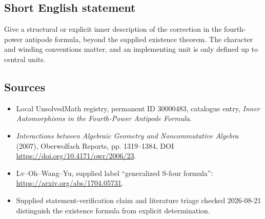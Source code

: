 \documentclass[11pt]{article}
\begin{document}
\subsection{Short English statement}
Give a structural or explicit inner description of the correction in the fourth-power antipode formula, beyond the supplied existence theorem. The character and winding conventions matter, and an implementing unit is only defined up to central units.
\subsection{Sources}
\begin{itemize}
\item Local UnsolvedMath registry, permanent ID 30000483, catalogue entry, \emph{Inner Automorphisms in the Fourth-Power Antipode Formula}.
\item \emph{Interactions between Algebraic Geometry and Noncommutative Algebra} (2007), Oberwolfach Reports, pp. 1319--1384, DOI \url{https://doi.org/10.4171/owr/2006/23}.
\item Lv--Oh--Wang--Yu, supplied label ``generalized S-four formula'': \url{https://arxiv.org/abs/1704.05731}.
\item Supplied statement-verification claim and literature triage checked 2026-08-21 distinguish the existence formula from explicit determination.
\end{itemize}
\end{document}

